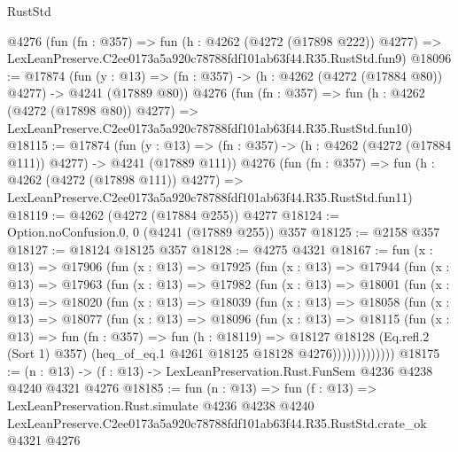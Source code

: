 \begin{lexlean}{RustStd}
\begin{coremodule}
    @4276
    (fun (fn : @357) =>
    fun (h : @4262 (@4272 (@17898 @222)) @4277) =>
    LexLeanPreserve.C2ee0173a5a920c78788fdf101ab63f44.R35.RustStd.fun9)
@18096 := @17874
    (fun (y : @13) => (fn : @357) -> (h : @4262 (@4272 (@17884 @80)) @4277) -> @4241 (@17889 @80))
    @4276
    (fun (fn : @357) =>
    fun (h : @4262 (@4272 (@17898 @80)) @4277) =>
    LexLeanPreserve.C2ee0173a5a920c78788fdf101ab63f44.R35.RustStd.fun10)
@18115 := @17874
    (fun (y : @13) => (fn : @357) -> (h : @4262 (@4272 (@17884 @111)) @4277) -> @4241 (@17889 @111))
    @4276
    (fun (fn : @357) =>
    fun (h : @4262 (@4272 (@17898 @111)) @4277) =>
    LexLeanPreserve.C2ee0173a5a920c78788fdf101ab63f44.R35.RustStd.fun11)
@18119 := @4262 (@4272 (@17884 @255)) @4277
@18124 := Option.noConfusion.{0, 0} (@4241 (@17889 @255)) @357
@18125 := @2158 @357
@18127 := @18124 @18125 @357
@18128 := @4275 @4321
@18167 := fun (x : @13) =>
  @17906
    (fun (x : @13) =>
    @17925
      (fun (x : @13) =>
      @17944
        (fun (x : @13) =>
        @17963
          (fun (x : @13) =>
          @17982
            (fun (x : @13) =>
            @18001
              (fun (x : @13) =>
              @18020
                (fun (x : @13) =>
                @18039
                  (fun (x : @13) =>
                  @18058
                    (fun (x : @13) =>
                    @18077
                      (fun (x : @13) =>
                      @18096
                        (fun (x : @13) =>
                        @18115
                          (fun (x : @13) =>
                          fun (fn : @357) =>
                          fun (h : @18119) =>
                          @18127
                            @18128
                            (Eq.refl.{2} (Sort 1) @357)
                            (heq_of_eq.{1} @4261 @18125 @18128 @4276)))))))))))))
@18175 := (n : @13) -> (f : @13) -> LexLeanPreservation.Rust.FunSem @4236 @4238 @4240 @4321 @4276
@18185 := fun (n : @13) =>
  fun (f : @13) =>
  LexLeanPreservation.Rust.simulate
    @4236
    @4238
    @4240
    LexLeanPreserve.C2ee0173a5a920c78788fdf101ab63f44.R35.RustStd.crate_ok
    @4321
    @4276
\end{coremodule}
\end{lexlean}

